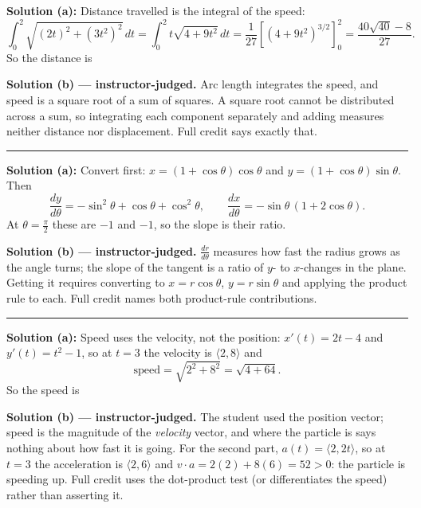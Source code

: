 \documentclass[12pt]{article}
\begin{document}
\textbf{Solution (a):} Distance travelled is the integral of the speed:
\[ \int_0^2 \sqrt{(2t)^2 + (3t^2)^2}\,dt = \int_0^2 t\sqrt{4 + 9t^2}\,dt = \frac{1}{27}\left[(4+9t^2)^{3/2}\right]_0^2 = \frac{40\sqrt{40} - 8}{27}. \]
So the distance is 

\textbf{Solution (b) --- instructor-judged.} Arc length integrates the speed, and speed is a square root of a sum of squares. A square root cannot be distributed across a sum, so integrating each component separately and adding measures neither distance nor displacement. Full credit says exactly that.

\vspace{0.2cm}\noindent\rule{\linewidth}{0.2pt}\vspace{0.2cm}


\textbf{Solution (a):} Convert first: $x = (1+\cos\theta)\cos\theta$ and $y = (1+\cos\theta)\sin\theta$. Then
\[ \frac{dy}{d\theta} = -\sin^2\theta + \cos\theta + \cos^2\theta, \qquad
   \frac{dx}{d\theta} = -\sin\theta\,(1 + 2\cos\theta). \]
At $\theta = \frac{\pi}{2}$ these are $-1$ and $-1$, so the slope is their ratio. 

\textbf{Solution (b) --- instructor-judged.} $\frac{dr}{d\theta}$ measures how fast the radius grows as the angle turns; the slope of the tangent is a ratio of $y$- to $x$-changes in the plane. Getting it requires converting to $x = r\cos\theta$, $y = r\sin\theta$ and applying the product rule to each. Full credit names both product-rule contributions.

\vspace{0.2cm}\noindent\rule{\linewidth}{0.2pt}\vspace{0.2cm}


\textbf{Solution (a):} Speed uses the velocity, not the position: $x'(t) = 2t - 4$ and $y'(t) = t^2 - 1$, so at $t = 3$ the velocity is $\langle 2, 8\rangle$ and
\[ \text{speed} = \sqrt{2^2 + 8^2} = \sqrt{4 + 64}. \]
So the speed is 

\textbf{Solution (b) --- instructor-judged.} The student used the position vector; speed is the magnitude of the \emph{velocity} vector, and where the particle is says nothing about how fast it is going. For the second part, $a(t) = \langle 2, 2t\rangle$, so at $t = 3$ the acceleration is $\langle 2, 6\rangle$ and $v\cdot a = 2(2) + 8(6) = 52 > 0$: the particle is speeding up. Full credit uses the dot-product test (or differentiates the speed) rather than asserting it.
\end{document}
